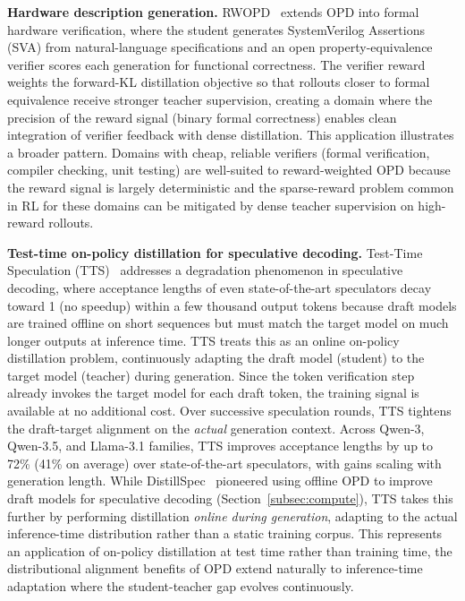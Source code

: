 \documentclass{article} %
\begin{document}
\textbf{Hardware description generation.} RWOPD~\citep{2605.13501} extends OPD into formal hardware verification, where the student generates SystemVerilog Assertions (SVA) from natural-language specifications and an open property-equivalence verifier scores each generation for functional correctness. The verifier reward weights the forward-KL distillation objective so that rollouts closer to formal equivalence receive stronger teacher supervision, creating a domain where the precision of the reward signal (binary formal correctness) enables clean integration of verifier feedback with dense distillation. This application illustrates a broader pattern. Domains with cheap, reliable verifiers (formal verification, compiler checking, unit testing) are well-suited to reward-weighted OPD because the reward signal is largely deterministic and the sparse-reward problem common in RL for these domains can be mitigated by dense teacher supervision on high-reward rollouts.

\textbf{Test-time on-policy distillation for speculative decoding.} Test-Time Speculation (TTS)~\citep{2605.09329} addresses a degradation phenomenon in speculative decoding, where acceptance lengths of even state-of-the-art speculators decay toward 1 (no speedup) within a few thousand output tokens because draft models are trained offline on short sequences but must match the target model on much longer outputs at inference time. TTS treats this as an online on-policy distillation problem, continuously adapting the draft model (student) to the target model (teacher) during generation. Since the token verification step already invokes the target model for each draft token, the training signal is available at no additional cost. Over successive speculation rounds, TTS tightens the draft-target alignment on the \emph{actual} generation context. Across Qwen-3, Qwen-3.5, and Llama-3.1 families, TTS improves acceptance lengths by up to 72\% (41\% on average) over state-of-the-art speculators, with gains scaling with generation length. While DistillSpec~\citep{2310.08461} pioneered using offline OPD to improve draft models for speculative decoding (Section~\ref{subsec:compute}), TTS takes this further by performing distillation \emph{online during generation}, adapting to the actual inference-time distribution rather than a static training corpus. This represents an application of on-policy distillation at test time rather than training time, the distributional alignment benefits of OPD extend naturally to inference-time adaptation where the student-teacher gap evolves continuously.
\end{document}
